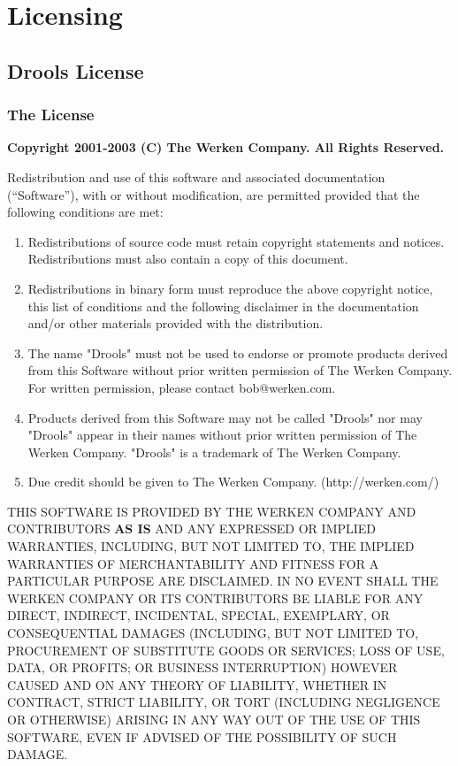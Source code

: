 \chapter{Licensing}

\section{Drools License}

\subsection{The License}

{
\footnotesize

\textbf{Copyright 2001-2003 (C) The Werken Company. All Rights Reserved.}

\bigskip
 
\noindent
 Redistribution and use of this software and associated documentation
 (``Software''), with or without modification, are permitted provided
 that the following conditions are met:

\begin{enumerate}
 \item Redistributions of source code must retain copyright
    statements and notices.  Redistributions must also contain a
    copy of this document.
 
 \item Redistributions in binary form must reproduce the
    above copyright notice, this list of conditions and the
    following disclaimer in the documentation and/or other
    materials provided with the distribution.
 
 \item The name "Drools" must not be used to endorse or promote
    products derived from this Software without prior written
    permission of The Werken Company.  For written permission,
    please contact bob@werken.com.
 
 \item Products derived from this Software may not be called "Drools"
    nor may "Drools" appear in their names without prior written
    permission of The Werken Company. "Drools" is a trademark of 
    The Werken Company.
 
 \item Due credit should be given to The Werken Company.
    (http://werken.com/)
\end{enumerate}
 
\noindent
 THIS SOFTWARE IS PROVIDED BY THE WERKEN COMPANY AND CONTRIBUTORS
 \textbf{AS IS} AND ANY EXPRESSED OR IMPLIED WARRANTIES, INCLUDING, BUT
 NOT LIMITED TO, THE IMPLIED WARRANTIES OF MERCHANTABILITY AND
 FITNESS FOR A PARTICULAR PURPOSE ARE DISCLAIMED.  IN NO EVENT SHALL
 THE WERKEN COMPANY OR ITS CONTRIBUTORS BE LIABLE FOR ANY DIRECT,
 INDIRECT, INCIDENTAL, SPECIAL, EXEMPLARY, OR CONSEQUENTIAL DAMAGES
 (INCLUDING, BUT NOT LIMITED TO, PROCUREMENT OF SUBSTITUTE GOODS OR
 SERVICES; LOSS OF USE, DATA, OR PROFITS; OR BUSINESS INTERRUPTION)
 HOWEVER CAUSED AND ON ANY THEORY OF LIABILITY, WHETHER IN CONTRACT,
 STRICT LIABILITY, OR TORT (INCLUDING NEGLIGENCE OR OTHERWISE)
 ARISING IN ANY WAY OUT OF THE USE OF THIS SOFTWARE, EVEN IF ADVISED
 OF THE POSSIBILITY OF SUCH DAMAGE.
}

